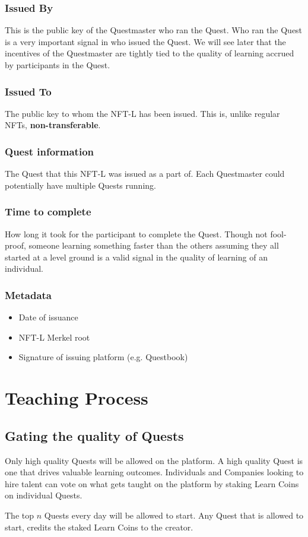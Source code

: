 \documentclass{article}
\begin{document}
      \subsubsection{Issued By}
        This is the public key of the Questmaster who ran the Quest. Who ran the Quest is a very important signal in who issued the Quest. We will see later that the incentives of the Questmaster are tightly tied to the quality of learning accrued by participants in the Quest. 
      \subsubsection{Issued To}
        The public key to whom the NFT-L has been issued. This is, unlike regular NFTs, \textbf{non-transferable}. 
      \subsubsection{Quest information}
        The Quest that this NFT-L was issued as a part of. Each Questmaster could potentially have multiple Quests running. 
      \subsubsection{Time to complete}
        How long it took for the participant to complete the Quest. Though not fool-proof, someone learning something faster than the others assuming they all started at a level ground is a valid signal in the quality of learning of an individual. 
      \subsubsection{Metadata}
        \begin{itemize}
          \item Date of issuance
          \item NFT-L Merkel root
          \item Signature of issuing platform (e.g. Questbook)
        \end{itemize}
      
  \section{Teaching Process}
    \subsection{Gating the quality of Quests}
        Only high quality Quests will be allowed on the platform.
        A high quality Quest is one that drives valuable learning outcomes. 
        Individuals and Companies looking to hire talent can vote on what gets taught on the platform by staking Learn Coins on individual Quests.
        \par
        The top \(n\) Quests every day will be allowed to start. Any Quest that is allowed to start, credits the staked Learn Coins to the creator.
\end{document}
